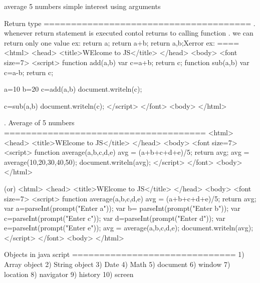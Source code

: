 average 5 numbers
simple interest using arguments

Return type
======================================
. whenever return statement is executed contol returns to calling function
. we can return only one value
 ex:
    return a;
    return a+b;
    return a,b;Xerror
ex:
====
<html>
  <head>
   <title>WElcome to JS</title>
  </head>
  <body>
    <font size=7>
     <script>       
		function add(a,b)
		{
			var c=a+b;
			return c;
		}
		function sub(a,b)
		{
			var c=a-b;
			return c;
		}

		a=10
		b=20
		c=add(a,b)
		document.writeln(c);

		c=sub(a,b)
		document.writeln(c);
	</script>
   </font>
  <body>
</html>

. Average of 5 numbers
=====================================
<html>
  <head>
   <title>WElcome to JS</title>
  </head>
  <body>
    <font size=7>
     <script>       
		function average(a,b,c,d,e)
		{
			avg = (a+b+c+d+e)/5;
			return avg;
		}
		avg = average(10,20,30,40,50);
		document.writeln(avg);
	</script>
   </font>
  <body>
</html>

(or)
<html>
  <head>
   <title>WElcome to JS</title>
  </head>
  <body>
    <font size=7>
     <script>       
		function average(a,b,c,d,e)
		{
			avg = (a+b+c+d+e)/5;
			return avg;
		}
		var a=parseInt(prompt("Enter a"));
		var b= parseInt(prompt("Enter b"));
		var c=parseInt(prompt("Enter c"));
		var d=parseInt(prompt("Enter d"));
		var e=parseInt(prompt("Enter e"));
		avg = average(a,b,c,d,e);
		document.writeln(avg);
	</script>
   </font>
  <body>
</html>

Objects in java script
==============================
1) Array object
2) String object
3) Date
4) Math
5) document
6) window
7) location
8) navigator
9) history
10) screen